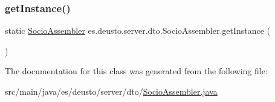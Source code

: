 \mbox{\label{classes_1_1deusto_1_1server_1_1dto_1_1_socio_assembler_ab9648d889af755ac3398a9a319a729d6}} 
\subsubsection{\texorpdfstring{getInstance()}{getInstance()}}
{\footnotesize\ttfamily static \mbox{\hyperlink{classes_1_1deusto_1_1server_1_1dto_1_1_socio_assembler}{Socio\+Assembler}} es.\+deusto.\+server.\+dto.\+Socio\+Assembler.\+get\+Instance (\begin{DoxyParamCaption}{ }\end{DoxyParamCaption})\hspace{0.3cm}{\ttfamily [static]}}



The documentation for this class was generated from the following file\+:\begin{DoxyCompactItemize}
\item 
src/main/java/es/deusto/server/dto/\mbox{\hyperlink{_socio_assembler_8java}{Socio\+Assembler.\+java}}\end{DoxyCompactItemize}
